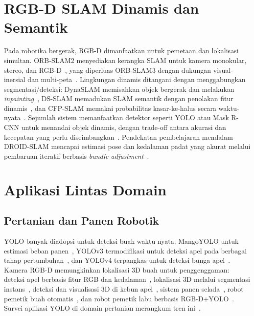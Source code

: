 \documentclass[11pt,a4paper]{article}
\begin{document}
\section{RGB-D SLAM Dinamis dan Semantik}
Pada robotika bergerak, RGB-D dimanfaatkan untuk pemetaan dan lokalisasi
simultan. ORB-SLAM2 menyediakan kerangka SLAM untuk kamera monokular, stereo, dan
RGB-D~\cite{murartal2017orbslam2}, yang diperluas ORB-SLAM3 dengan dukungan
visual-inersial dan multi-peta~\cite{campos2021orbslam3}. Lingkungan dinamis ditangani dengan menggabungkan
segmentasi/deteksi: DynaSLAM memisahkan objek bergerak dan melakukan
\emph{inpainting}~\cite{bescos2018dynaslam}, DS-SLAM memadukan SLAM semantik dengan
penolakan fitur dinamis~\cite{yu2018dsslam}, dan CFP-SLAM memakai probabilitas
kasar-ke-halus secara waktu-nyata~\cite{hu2022cfpslam}. Sejumlah sistem
memanfaatkan detektor seperti YOLO atau Mask R-CNN untuk menandai objek dinamis,
dengan trade-off antara akurasi dan kecepatan yang perlu
diseimbangkan~\cite{soares2019visualslam}. Pendekatan pembelajaran mendalam
DROID-SLAM mencapai estimasi pose dan kedalaman padat yang akurat melalui
pembaruan iteratif berbasis \emph{bundle adjustment}~\cite{teed2021droidslam}.

\section{Aplikasi Lintas Domain}
\subsection{Pertanian dan Panen Robotik}
YOLO banyak diadopsi untuk deteksi buah waktu-nyata: MangoYOLO untuk estimasi
beban panen~\cite{koirala2019deepfruit}, YOLOv3 termodifikasi untuk deteksi apel
pada berbagai tahap pertumbuhan~\cite{tian2019appleyolo}, dan YOLOv4 terpangkas
untuk deteksi bunga apel~\cite{wu2020flower}. Kamera RGB-D memungkinkan lokalisasi
3D buah untuk penggenggaman: deteksi apel berbasis fitur RGB dan
kedalaman~\cite{fu2020apple}, lokalisasi 3D melalui segmentasi
instans~\cite{genemola2020fruit3d}, deteksi dan visualisasi 3D di kebun
apel~\cite{kang2020strawberry}, sistem panen selada~\cite{birrell2020lettuce},
robot pemetik buah otomatis~\cite{onishi2019harvest}, dan robot pemetik labu
berbasis RGB-D+YOLO~\cite{ito2024pumpkin}. Survei aplikasi YOLO di domain
pertanian merangkum tren ini~\cite{sapkota2024yoloagri}.
\end{document}
